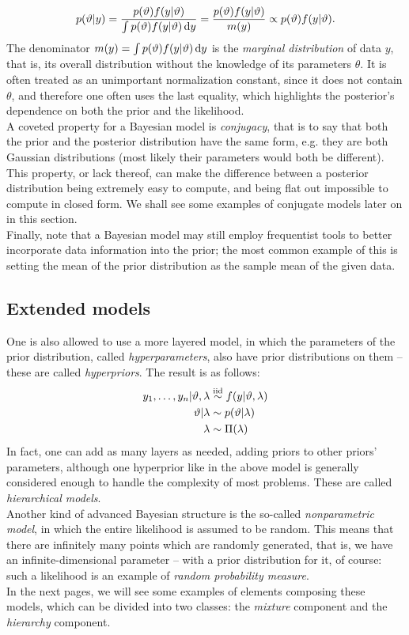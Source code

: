 $$ p(\vartheta|y) = \frac{p(\vartheta) f(y|\vartheta)}{\int p(\vartheta) f(y|\vartheta) \, \mathrm d y} =
\frac{p(\vartheta) f(y|\vartheta)}{m(y)} \propto p(\vartheta) f(y|\vartheta).
$$
The denominator $m(y) = \int p(\vartheta) f(y|\vartheta) \, \mathrm d y$ is the \emph{marginal distribution} of data $y$, that is, its overall distribution without the knowledge of its parameters $\theta$.
It is often treated as an unimportant normalization constant, since it does not contain $\theta$, and therefore one often uses the last equality, which highlights the posterior's dependence on both the prior and the likelihood. \\
A coveted property for a Bayesian model is \emph{conjugacy}, that is to say that both the prior and the posterior distribution have the same form, e.g. they are both Gaussian distributions (most likely their parameters would both be different).
This property, or lack thereof, can make the difference between a posterior distribution being extremely easy to compute, and being flat out impossible to compute in closed form.
We shall see some examples of conjugate models later on in this section. \\
Finally, note that a Bayesian model may still employ frequentist tools to better incorporate data information into the prior; the most common example of this is setting the mean of the prior distribution as the sample mean of the given data.

\subsection{Extended models} 
One is also allowed to use a more layered model, in which the parameters of the prior distribution, called \emph{hyperparameters}, also have prior distributions on them -- these are called \emph{hyperpriors}.
The result is as follows:
\begin{align*}
	y_1, \dots, y_n | \vartheta, \lambda &\stackrel{\text{iid}}{\sim} f(y|\vartheta, \lambda) \\
	\vartheta | \lambda &\sim p(\vartheta|\lambda) \\
	\lambda &\sim \Pi(\lambda)
\end{align*}
In fact, one can add as many layers as needed, adding priors to other priors' parameters, although one hyperprior like in the above model is generally considered enough to handle the complexity of most problems.
These are called \emph{hierarchical models}. \\
Another kind of advanced Bayesian structure is the so-called \emph{nonparametric model}, in which the entire likelihood is assumed to be random.
This means that there are infinitely many points which are randomly generated, that is, we have an infinite-dimensional parameter -- with a prior distribution for it, of course:
such a likelihood is an example of \emph{random probability measure}. \\
In the next pages, we will see some examples of elements composing these models, which can be divided into two classes: the \emph{mixture} component and the \emph{hierarchy} component.


